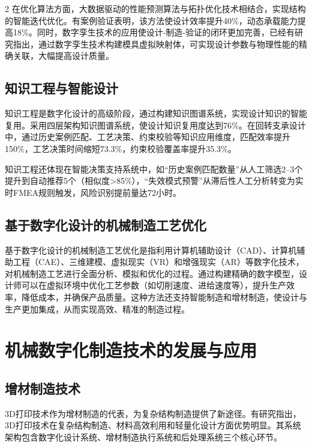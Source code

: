 \documentclass[fontset=windows,12pt,UTF8]{ctexart}
\begin{document}
\begin{multicols}{2}
	在优化算法方面，大数据驱动的性能预测算法与拓扑优化技术相结合，实现结构的智能迭代优化。有案例验证表明，该方法使设计效率提升40\%，动态承载能力提高18\%\cite{__2025-8}。同时，数字孪生技术的应用使设计-制造-验证的闭环更加完善，已经有研究指出，通过数字孪生技术构建模具虚拟映射体，可实现设计参数与物理性能的精确关联，大幅提高设计质量\cite{__2025-3}。

	\subsection{知识工程与智能设计}

	知识工程是数字化设计的高级阶段，通过构建知识图谱系统，实现设计知识的智能复用。采用四层架构知识图谱系统，使设计知识复用度达到76\%。在回转支承设计中，通过历史案例匹配、工艺决策、约束校验等知识应用维度，匹配效率提升150\%，工艺决策时间缩短73.3\%，约束校验覆盖率提升35.3\%\cite{__2025-8}。

	知识工程还体现在智能决策支持系统中，如“历史案例匹配数量”从人工筛选2--3个提升到自动推荐5个（相似度>85\%），“失效模式预警”从滞后性人工分析转变为实时FMEA规则触发，风险识别提前量达72小时。

	\subsection{基于数字化设计的机械制造工艺优化}

	基于数字化设计的机械制造工艺优化是指利用计算机辅助设计（CAD）、计算机辅助工程（CAE）、三维建模、虚拟现实（VR）和增强现实（AR）等数字化技术，对机械制造工艺进行全面分析、模拟和优化的过程。通过构建精确的数字模型，设计师可以在虚拟环境中优化工艺参数（如切削速度、进给速度等），提升生产效率，降低成本，并确保产品质量。这种方法还支持智能制造和增材制造，使设计与生产更加集成，从而实现高效、精准的制造过程\cite{__2025-9}。

	\section{机械数字化制造技术的发展与应用}

	\subsection{增材制造技术}

	3D打印技术作为增材制造的代表，为复杂结构制造提供了新途径。有研究指出，3D打印技术在复杂结构制造、材料高效利用和轻量化设计方面优势明显。其系统架构包含数字化设计系统、增材制造执行系统和后处理系统三个核心环节\cite{_3d_2025}。


\end{multicols}
\end{document}
